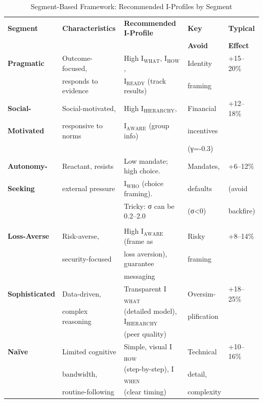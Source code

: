 \begin{table}[htbp]
\centering
\caption{Segment-Based Framework: Recommended I-Profiles by Segment}
\label{tab:20-f4-segments}
\renewcommand{\arraystretch}{1.3}
\footnotesize
\begin{tabular}{@{}llp{5cm}ll@{}}
\toprule
\textbf{Segment} & \textbf{Characteristics} & \textbf{Recommended I-Profile} & \textbf{Key} & \textbf{Typical} \\
& & & \textbf{Avoid} & \textbf{Effect} \\
\midrule
\textbf{Pragmatic} & Outcome-focused, & High I$_{\text{WHAT}}$, I$_{\text{HOW}}$, & Identity & +15--20\% \\
& responds to evidence & I$_{\text{READY}}$ (track results) & framing & \\
\midrule
\textbf{Social-} & Social-motivated, & High I$_{\text{HIERARCHY}}$, & Financial & +12--18\% \\
\textbf{Motivated} & responsive to norms & I$_{\text{AWARE}}$ (group info) & incentives & \\
& & & (γ=-0.3) & \\
\midrule
\textbf{Autonomy-} & Reactant, resists & Low mandate; high choice. & Mandates, & +6--12\% \\
\textbf{Seeking} & external pressure & I$_{\text{WHO}}$ (choice framing). & defaults & (avoid \\
& & Tricky: σ can be 0.2--2.0 & (σ<0) & backfire) \\
& & & & \\
\midrule
\textbf{Loss-Averse} & Risk-averse, & High I$_{\text{AWARE}}$ (frame as & Risky & +8--14\% \\
& security-focused & loss aversion), guarantee & framing & \\
& & messaging & & \\
\midrule
\textbf{Sophisticated} & Data-driven, & Transparent I$_{\text{WHAT}}$ & Oversim- & +18--25\% \\
& complex reasoning & (detailed model), I$_{\text{HIERARCHY}}$ & plification & \\
& & (peer quality) & & \\
\midrule
\textbf{Naïve} & Limited cognitive & Simple, visual I$_{\text{HOW}}$ & Technical & +10--16\% \\
& bandwidth, & (step-by-step), I$_{\text{WHEN}}$ & detail, & \\
& routine-following & (clear timing) & complexity & \\
\bottomrule
\end{tabular}
\end{table}

